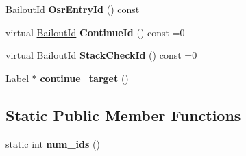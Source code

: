 \begin{DoxyCompactItemize}
\item 
\hyperlink{classv8_1_1internal_1_1_bailout_id}{Bailout\+Id} {\bfseries Osr\+Entry\+Id} () const \hypertarget{classv8_1_1internal_1_1_iteration_statement_a095235d0a9e508a2484a3a6a31abb655}{}\label{classv8_1_1internal_1_1_iteration_statement_a095235d0a9e508a2484a3a6a31abb655}

\item 
virtual \hyperlink{classv8_1_1internal_1_1_bailout_id}{Bailout\+Id} {\bfseries Continue\+Id} () const  =0\hypertarget{classv8_1_1internal_1_1_iteration_statement_a1008bf0473e2c103c06cef030e2d8f25}{}\label{classv8_1_1internal_1_1_iteration_statement_a1008bf0473e2c103c06cef030e2d8f25}

\item 
virtual \hyperlink{classv8_1_1internal_1_1_bailout_id}{Bailout\+Id} {\bfseries Stack\+Check\+Id} () const  =0\hypertarget{classv8_1_1internal_1_1_iteration_statement_a1493067eee4f8b1949c84e86e3fe859e}{}\label{classv8_1_1internal_1_1_iteration_statement_a1493067eee4f8b1949c84e86e3fe859e}

\item 
\hyperlink{classv8_1_1internal_1_1_label}{Label} $\ast$ {\bfseries continue\+\_\+target} ()\hypertarget{classv8_1_1internal_1_1_iteration_statement_aa7abfb37a65b3f2812b88d8674ed7df0}{}\label{classv8_1_1internal_1_1_iteration_statement_aa7abfb37a65b3f2812b88d8674ed7df0}

\end{DoxyCompactItemize}
\subsection*{Static Public Member Functions}
\begin{DoxyCompactItemize}
\item 
static int {\bfseries num\+\_\+ids} ()\hypertarget{classv8_1_1internal_1_1_iteration_statement_ad3975983ae72186a4bdba54190e6650d}{}\label{classv8_1_1internal_1_1_iteration_statement_ad3975983ae72186a4bdba54190e6650d}

\end{DoxyCompactItemize}
